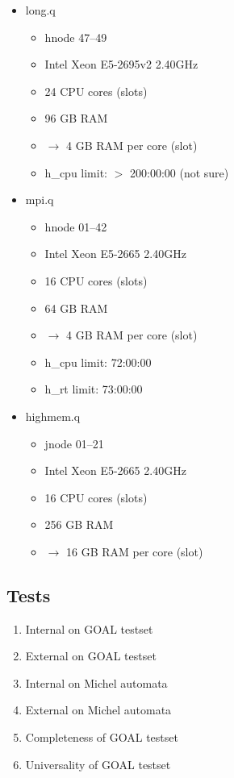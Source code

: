 \begin{itemize}
\item long.q
  \begin{itemize}
  \item hnode 47--49
  \item Intel Xeon E5-2695v2 2.40GHz
  \item 24 CPU cores (slots)
  \item 96 GB RAM
  \item $\rightarrow$ 4 GB RAM per core (slot)
  \item h\_cpu limit: $>$ 200:00:00 (not sure)
  \end{itemize}
\item mpi.q
  \begin{itemize}
  \item hnode 01--42
  \item Intel Xeon E5-2665 2.40GHz
  \item 16 CPU cores (slots)
  \item 64 GB RAM
  \item $\rightarrow$ 4 GB RAM per core (slot)
  \item h\_cpu limit: 72:00:00
  \item h\_rt limit: 73:00:00
  \end{itemize}
\item highmem.q
  \begin{itemize}
  \item jnode 01--21
  \item Intel Xeon E5-2665 2.40GHz
  \item 16 CPU cores (slots)
  \item 256 GB RAM
  \item $\rightarrow$ 16 GB RAM per core (slot)
  \end{itemize}
\end{itemize}


\subsection*{Tests}

\begin{enumerate}
\item Internal on GOAL testset
\item External on GOAL testset
\item Internal on Michel automata
\item External on Michel automata
\item Completeness of GOAL testset
\item Universality of GOAL testset
\end{enumerate}

